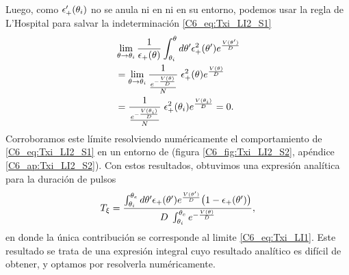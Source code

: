 \documentclass[./main.tex]{subfiles}
\begin{document}
Luego, como $\epsilon_{+}'(\theta_i)$ no se anula ni en \xxi ni en su entorno, podemos usar la regla de L'Hospital para salvar la indeterminación \ref{C6_eq:Txi_LI2_S1}
\begin{align}
     & \lim_{\theta \rightarrow   \theta_i } \frac{1}{\epsilon_{+}(\theta)}  \int_{\theta_i}^{\theta} d\theta'  \epsilon_{+}^2(\theta') e^{ \frac{V(\theta')}{D}} \nonumber \\
     & = \lim_{\theta \rightarrow   \theta_i } \frac{1}{\frac{e^{- \frac{V(\theta)}{D}}}{N}}  \; \epsilon_{+}^2(\theta) e^{ \frac{V(\theta)}{D}} \nonumber \\
     & = \frac{1}{\frac{e^{- \frac{V(\theta_i)}{D}}}{N}}  \; \epsilon_{+}^2(\theta_i) e^{ \frac{V(\theta_i)}{D}} = 0. 
     \label{C6_eq:Txi_LI2_S2}
\end{align}
Corroboramos este límite resolviendo numéricamente el comportamiento de \ref{C6_eq:Txi_LI2_S1} en un entorno de \xxi (figura \ref{C6_fig:Txi_LI2_S2}, apéndice \ref{C6_ap:Txi_LI2_S2}). Con estos resultados, obtuvimos una expresión analítica para la duración de pulsos
\begin{align}
     T_\xi = \frac{\int_{\theta_i}^{\theta_e} d \theta' \epsilon_{+}(\theta') e^{ \frac{V(\theta')}{D}} \big(1 - \epsilon_{+}(\theta') \big)}{D\; \int_{\theta_i}^{\theta_e} e^{- \frac{V(\theta)}{D}}},
     \label{C6_eq:Txi}
\end{align}
en donde la única contribución se corresponde al limite \ref{C6_eq:Txi_LI1}. Este resultado se trata de una expresión integral cuyo resultado analítico es difícil de obtener, y optamos por resolverla numéricamente.
\end{document}
